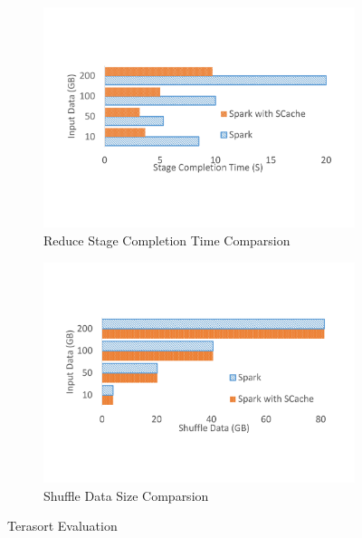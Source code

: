 
\begin{figure}
\begin{subfigure}{\linewidth}
	\includegraphics[width=\linewidth]{fig/tera}
	\caption{Reduce Stage Completion Time Comparsion}
	\label{fig:terasort}
\end{subfigure}
\begin{subfigure}{\linewidth}
	\includegraphics[width=\linewidth]{fig/tera_shuffle}
	\caption{Shuffle Data Size Comparsion}
	\label{fig:terashuffle}
\end{subfigure}
\caption{Terasort Evaluation}
\end{figure}

